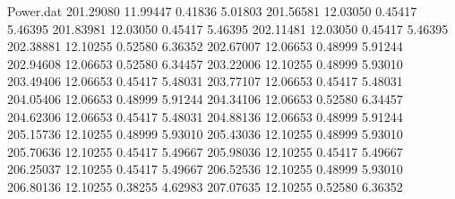 \begin{filecontents}{Power.dat}
 201.29080   11.99447    0.41836    5.01803
 201.56581   12.03050    0.45417    5.46395
 201.83981   12.03050    0.45417    5.46395
 202.11481   12.03050    0.45417    5.46395
 202.38881   12.10255    0.52580    6.36352
 202.67007   12.06653    0.48999    5.91244
 202.94608   12.06653    0.52580    6.34457
 203.22006   12.10255    0.48999    5.93010
 203.49406   12.06653    0.45417    5.48031
 203.77107   12.06653    0.45417    5.48031
 204.05406   12.06653    0.48999    5.91244
 204.34106   12.06653    0.52580    6.34457
 204.62306   12.06653    0.45417    5.48031
 204.88136   12.06653    0.48999    5.91244
 205.15736   12.10255    0.48999    5.93010
 205.43036   12.10255    0.48999    5.93010
 205.70636   12.10255    0.45417    5.49667
 205.98036   12.10255    0.45417    5.49667
 206.25037   12.10255    0.45417    5.49667
 206.52536   12.10255    0.48999    5.93010
 206.80136   12.10255    0.38255    4.62983
 207.07635   12.10255    0.52580    6.36352
\end{filecontents}
